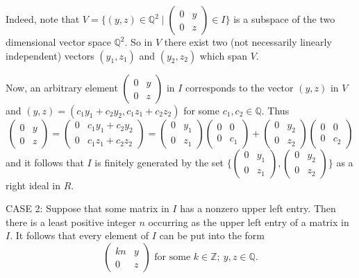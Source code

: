 \documentclass[12pt]{article}
\begin{document}
Indeed, note that
\(
V = \{(y,z)\in\mathbb{Q}^2\mid
\begin{pmatrix}
0 & y\\
0 & z
\end{pmatrix}\in I\}
\)
is a subspace of the two dimensional vector space $\mathbb{Q}^2$. So in $V$ there exist two 
(not necessarily linearly independent) vectors $(y_1,z_1)$ and $(y_2,z_2)$ 
which span $V$.

Now, an arbitrary element 
\(
\begin{pmatrix}
0 & y\\
0 & z
\end{pmatrix}
\)
in $I$ corresponds to the vector $(y,z)$ in $V$ and $
(y,z)=(c_1y_1+c_2y_2,c_1z_1+c_2z_2)$ for some $c_1, c_2\in\mathbb{Q}$. Thus
\[
\begin{pmatrix}
0 & y\\
0 & z
\end{pmatrix}
=
\begin{pmatrix}
0 & c_1y_1+c_2y_2\\
0 & c_1z_1+c_2z_2
\end{pmatrix}
=
\begin{pmatrix}
0 & y_1\\
0 & z_1
\end{pmatrix}
\begin{pmatrix}
0 & 0\\
0 & c_1
\end{pmatrix}
+
\begin{pmatrix}
0 & y_2\\
0 & z_2
\end{pmatrix}
\begin{pmatrix}
0 & 0\\
0 & c_2
\end{pmatrix}
\]
and it follows that $I$ is finitely generated 
by the set
\(\{
\begin{pmatrix}
0 & y_1\\
0 & z_1
\end{pmatrix},
\begin{pmatrix}
0 & y_2\\
0 & z_2
\end{pmatrix}
\}
\)
as a right ideal in $R$.

CASE 2: Suppose that some matrix in $I$ has a nonzero upper left entry. Then there is a least positive 
integer $n$ occurring as the upper left entry of a matrix in $I$. It follows that every element 
of $I$ can be put into the form
\[
\begin{pmatrix}
kn & y\\
0 & z
\end{pmatrix}
\text{ for some }k\in\mathbb{Z};\ y, z\in \mathbb{Q}.
\]
\end{document}
